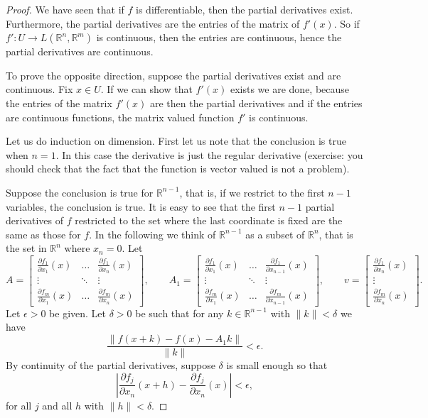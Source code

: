 \documentclass[12pt]{book}
\newcommand{\snorm}[1]{\lVert {#1} \rVert}
\newcommand{\abs}[1]{\left\lvert {#1} \right\rvert}
\newcommand{\R}{{\mathbb{R}}}
\theoremstyle{plain}
\theoremstyle{remark}
\theoremstyle{definition}
\theoremstyle{exercise}
\theoremstyle{example}
\begin{document}
\begin{proof}
We have seen that if $f$ is differentiable, then
the partial derivatives exist.  Furthermore, the partial
derivatives are the entries of the matrix of $f'(x)$.  So if
$f' \colon U \to L(\R^n,\R^m)$ is continuous, then the entries are
continuous, hence the partial derivatives are continuous.

To prove the opposite direction,
suppose the partial derivatives exist and are continuous.
Fix $x \in U$.  If we can show that $f'(x)$ exists we are done, because
the entries of the matrix $f'(x)$ are then the partial derivatives and if
the entries are continuous functions, the matrix valued function $f'$ is
continuous.

Let us do induction on dimension.  First let us note that
the conclusion is true when $n=1$.  In this case the derivative
is just the regular derivative (exercise: you should check that the fact
that the function is vector valued is not a problem).

Suppose the conclusion is true for $\R^{n-1}$,
that is,
if we restrict to the first $n-1$ variables, the conclusion is true.
It is easy to see that the first $n-1$
partial derivatives of $f$ restricted to the set where the last coordinate is
fixed are the same as those for $f$.
In the following
we think of $\R^{n-1}$ as a subset of $\R^n$, that is the set in $\R^n$ where $x_n = 0$.
Let
\begin{equation*}
A = 
\begin{bmatrix}
\frac{\partial f_1}{\partial x_1}(x)
& \ldots &
\frac{\partial f_1}{\partial x_n}(x)
\\
\vdots & \ddots & \vdots
\\
\frac{\partial f_m}{\partial x_1}(x)
& \ldots &
\frac{\partial f_m}{\partial x_n}(x)
\end{bmatrix} ,
\qquad
A_1 = 
\begin{bmatrix}
\frac{\partial f_1}{\partial x_1}(x)
& \ldots &
\frac{\partial f_1}{\partial x_{n-1}}(x)
\\
\vdots & \ddots & \vdots
\\
\frac{\partial f_m}{\partial x_1}(x)
& \ldots &
\frac{\partial f_m}{\partial x_{n-1}}(x)
\end{bmatrix} ,
\qquad
v = 
\begin{bmatrix}
\frac{\partial f_1}{\partial x_n}(x)
\\
\vdots
\\
\frac{\partial f_m}{\partial x_n}(x)
\end{bmatrix} .
\end{equation*}
Let $\epsilon > 0$ be given.  Let $\delta > 0$ be such that
for any $k \in \R^{n-1}$ with $\snorm{k} < \delta$ we have
\begin{equation*}
\frac{\snorm{f(x+k) - f(x) - A_1k}}{\snorm{k}} < \epsilon .
\end{equation*}
By continuity of the partial derivatives, suppose $\delta$ is small
enough so that
\begin{equation*}
\abs{\frac{\partial f_j}{\partial x_n}(x+h)
      - \frac{\partial f_j}{\partial x_n}(x)} < \epsilon ,
\end{equation*}
for all $j$ and all $h$ with $\snorm{h} < \delta$.


\end{proof}
\end{document}
